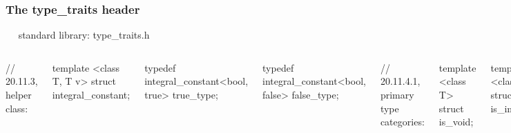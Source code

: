 \begin{frame}[fragile,t]
\frametitle{The type\_traits header}
{\ \ } standard library: type\_traits.h

\begin{columns}[t]

{\tiny
// 20.11.3, helper class:

template <class T, T v> struct integral\_constant;

typedef integral\_constant<bool, true> true\_type;

typedef integral\_constant<bool, false> false\_type;

// 20.11.4.1, primary type categories:

template <class T> struct is\_void;

template <class T> struct is\_integral;

template <class T> struct is\_floating\_point;

template <class T> struct is\_array;

template <class T> struct is\_pointer;

template <class T> struct is\_lvalue\_reference;

template <class T> struct is\_rvalue\_reference;

template <class T> struct is\_member\_object\_pointer;

template <class T> struct is\_member\_function\_pointer;

template <class T> struct is\_enum;

template <class T> struct is\_union;

template <class T> struct is\_class;

template <class T> struct is\_function;

// 20.11.4.2, composite type categories:

template <class T> struct is\_reference;

template <class T> struct is\_arithmetic;

template <class T> struct is\_fundamental;

template <class T> struct is\_object;

template <class T> struct is\_scalar;

template <class T> struct is\_compound;

template <class T> struct is\_member\_pointer;

// 20.11.4.3, type properties:

}
\end{columns}
\end{frame}
